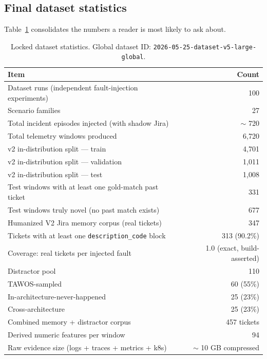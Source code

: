 \subsection{Final dataset statistics}

Table~\ref{tab:dataset-numbers} consolidates the numbers a reader is most likely to ask about.

\begin{table}[h]
\centering
\caption{Locked dataset statistics. Global dataset ID: \texttt{2026-05-25-dataset-v5-large-global}.}
\label{tab:dataset-numbers}
\small
\begin{tabular}{lr}
\toprule
Item & Count \\
\midrule
Dataset runs (independent fault-injection experiments) & 100 \\
Scenario families & 27 \\
Total incident episodes injected (with shadow Jira) & $\sim$ 720 \\
Total telemetry windows produced & 6{,}720 \\
v2 in-distribution split --- train & 4{,}701 \\
v2 in-distribution split --- validation & 1{,}011 \\
v2 in-distribution split --- test & 1{,}008 \\
\quad Test windows with at least one gold-match past ticket & 331 \\
\quad Test windows truly novel (no past match exists) & 677 \\
Humanized V2 Jira memory corpus (real tickets) & 347 \\
\quad Tickets with at least one \texttt{description\_code} block & 313 (90.2\%) \\
\quad Coverage: real tickets per injected fault & 1.0 (exact, build-asserted) \\
Distractor pool & 110 \\
\quad TAWOS-sampled & 60 (55\%) \\
\quad In-architecture-never-happened & 25 (23\%) \\
\quad Cross-architecture & 25 (23\%) \\
Combined memory + distractor corpus & 457 tickets \\
Derived numeric features per window & 94 \\
Raw evidence size (logs + traces + metrics + k8s) & $\sim$ 10 GB compressed \\
\bottomrule
\end{tabular}
\end{table}

